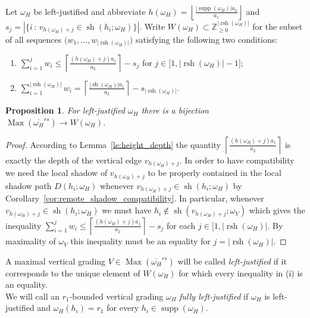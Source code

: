 \documentclass{amsart}
\newtheorem{proposition}[theorem]{Proposition}
\newcommand{\ZZ}{\mathbb{Z}}
\newcommand{\supp}{\operatorname{supp}}
\newcommand{\Max}{\operatorname{Max}}
\newcommand{\rsh}{\operatorname{rsh}}
\newcommand{\sh}{\operatorname{sh}}
\newcommand{\st}{\,:\,}
\newenvironment{enumeratei}{\begin{enumerate}[\upshape (i)]}
                           {\end{enumerate}}
\begin{document}
 Let $\omega_H$ be left-justified and abbreviate $h(\omega_H)=\left\lfloor\frac{|\supp(\omega_H)|a_2}{a_1}\right\rfloor$ and $s_j=|\{i\st v_{h(\omega_H)+j}\in\sh(h_i;\omega_H)\}|$.  Write $W(\omega_H)\subset\ZZ_{\ge0}^{|\rsh(\omega_H)|}$ for the subset of all sequences $\big(w_1,\ldots,w_{|\rsh(\omega_H)|}\big)$ satisfying the following two conditions:
 \begin{enumeratei}
  \item $\sum\limits_{i=1}^j w_i\le\left\lceil\frac{(h(\omega_H)+j)a_1}{a_2}\right\rceil-s_j$ for $j\in\big[1,|\rsh(\omega_H)|-1\big]$;
  \item $\sum\limits_{i=1}^{|\rsh(\omega_H)|} w_i=\left\lceil\frac{|\sh(\omega_H)|a_1}{a_2}\right\rceil-s_{|\rsh(\omega_H)|}$.
 \end{enumeratei}
 \begin{proposition}
  For left-justified $\omega_H$ there is a bijection $\Max(\overline{\omega_H}^{rs})\to W(\omega_H)$.
 \end{proposition}
 \begin{proof}
  According to Lemma~\ref{le:height_depth} the quantity $\left\lceil\frac{(h(\omega_H)+j)a_1}{a_2}\right\rceil$ is exactly the depth of the vertical edge $v_{h(\omega_H)+j}$.  In order to have compatibility we need the local shadow of $v_{h(\omega_H)+j}$ to be properly contained in the local shadow path $D(h_i;\omega_H)$ whenever $v_{h(\omega_H)+j}\in\sh(h_i;\omega_H)$ by Corollary~\ref{cor:remote_shadow_compatibility}.  In particular, whenever $v_{h(\omega_H)+j}\in\sh(h_i;\omega_H)$ we must have $h_i\notin\sh(v_{h(\omega_H)+j};\omega_V)$ which gives the inequality $\sum\limits_{i=1}^j w_i\le\left\lceil\frac{(h(\omega_H)+j)a_1}{a_2}\right\rceil-s_j$ for each $j\in[1,|\rsh(\omega_H)|$.  By maximality of $\omega_V$ this inequality must be an equality for $j=|\rsh(\omega_H)|$.
 \end{proof}

 A maximal vertical grading $V\in\Max(\overline{\omega_H}^{rs})$ will be called \emph{left-justified} if it corresponds to the unique element of $W(\omega_H)$ for which every inequality in (i) is an equality.\\

 We will call an $r_1$-bounded vertical grading $\omega_H$ \emph{fully left-justified} if $\omega_H$ is left-justified and $\omega_H(h_i)=r_1$ for every $h_i\in\supp(\omega_H)$.
 



 \ \\
 \ \\
 \ \\
\end{document}
